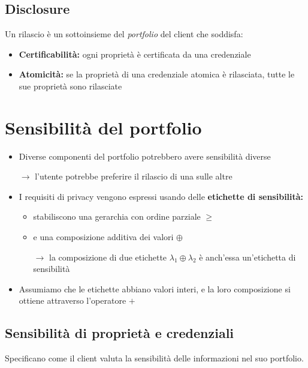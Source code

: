 \documentclass{report}
\begin{document}
\newpage
\subsection{Disclosure}
Un rilascio è un sottoinsieme del \textit{portfolio} del client che soddisfa:
\begin{itemize}
    \item \textbf{Certificabilità:} ogni proprietà è certificata da una credenziale
    \item \textbf{Atomicità:} se la proprietà di una credenziale atomica è rilasciata, tutte le sue proprietà sono rilasciate 
\end{itemize}

\section{Sensibilità del portfolio}

\begin{itemize}
    \item Diverse componenti del portfolio potrebbero avere sensibilità diverse
    
    $\rightarrow$ l'utente potrebbe preferire il rilascio di una sulle altre
    \item I requisiti di privacy vengono espressi usando delle \textbf{etichette di sensibilità:} 
    \begin{itemize}
        \item stabiliscono una gerarchia con ordine parziale $\geq$
        \item e una composizione additiva dei valori $\oplus$ 
        
        $\rightarrow$ la composizione di due etichette $\lambda_1 \oplus \lambda_2$ è anch'essa un'etichetta di sensibilità 
    \end{itemize}
    \item Assumiamo che le etichette abbiano valori interi, e la loro composizione si ottiene attraverso l'operatore $+$
\end{itemize}

\newpage
\subsection{Sensibilità di proprietà e credenziali}
Specificano come il client valuta la sensibilità delle informazioni nel suo portfolio.
\end{document}

